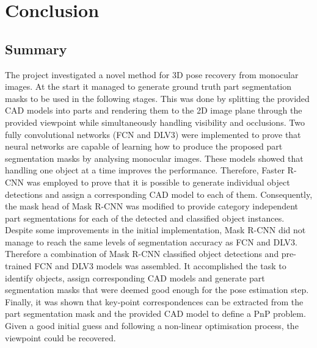 \documentclass[main.tex]{subfiles}
\begin{document}
\section{Conclusion}
\subsection{Summary}
The project investigated a novel method for 3D pose recovery from monocular images. At the start it managed to generate ground truth part segmentation masks to be used in the following stages. This was done by splitting the provided CAD models into parts and rendering them to the 2D image plane through the provided viewpoint while simultaneously handling visibility and occlusions. Two fully convolutional networks (FCN and DLV3) were implemented to prove that neural networks are capable of learning how to produce the proposed part segmentation masks by analysing monocular images. These models showed that handling one object at a time improves the performance. Therefore, Faster R-CNN was employed to prove that it is possible to generate individual object detections and assign a corresponding CAD model to each of them. Consequently, the mask head of Mask R-CNN was modified to provide category independent part segmentations for each of the detected and classified object instances. Despite some improvements in the initial implementation, Mask R-CNN did not manage to reach the same levels of segmentation accuracy as FCN and DLV3. Therefore a combination of Mask R-CNN classified object detections and pre-trained FCN and DLV3 models was assembled. It accomplished the task to identify objects, assign corresponding CAD models and generate part segmentation masks that were deemed good enough for the pose estimation step. Finally, it was shown that key-point correspondences can be extracted from the part segmentation mask and the provided CAD model to define a PnP problem. Given a good initial guess and following a non-linear optimisation process, the viewpoint could be recovered.
\end{document}
